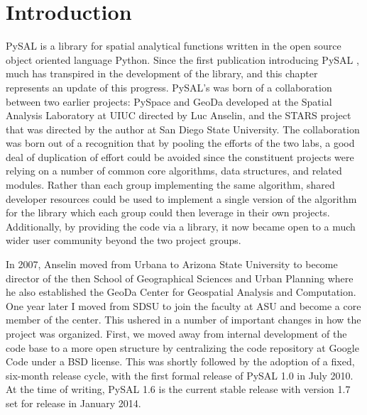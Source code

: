 \documentclass[11pt, titlepage]{article}
\begin{document}
\maketitle



\section{Introduction}
PySAL is a library for spatial analytical functions written in the open
source object oriented language Python.
Since the first publication introducing PySAL \citep{Rey:2007ox},
much has transpired in the development of the library, and this chapter
represents an update of this progress. PySAL's was born of a
collaboration between two earlier projects: PySpace and GeoDa developed
at the Spatial Analysis Laboratory at UIUC directed by Luc Anselin, and
the STARS project that was directed by the author at San Diego State
University. The collaboration was born out of a recognition that by
pooling the efforts of the two labs, a good deal of duplication of
effort could be avoided since the constituent projects were relying on a
number of common core algorithms, data structures, and related modules.
Rather than each group implementing the same algorithm, shared developer
resources could be used to implement a single version of the algorithm
for the library which each group could then leverage in their own
projects.  Additionally, by providing the code via a library, it now
became open to a much wider user community beyond the two project
groups.

In 2007, Anselin moved from Urbana to Arizona State University to become
director of the then School of Geographical Sciences and Urban Planning
where he also established the GeoDa Center for Geospatial Analysis and
Computation. One year later I moved from SDSU to join the faculty at ASU
and become a core member of the center. This ushered in a number of
important changes in how the project was organized. First, we moved away
from internal development of the code base to a more open structure by
centralizing the code repository at Google Code under a BSD license.
This was shortly followed by the adoption of a fixed, six-month release
cycle, with the first formal release of PySAL 1.0 in July 2010. At the
time of writing, PySAL 1.6 is the current stable release with version
1.7 set for release in January 2014.
\end{document}
